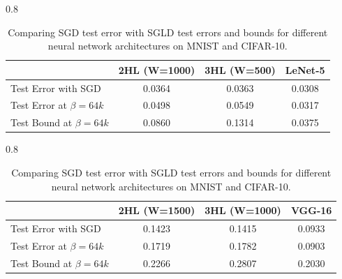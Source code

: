 \documentclass{article} %
\begin{document}
\begin{table}[htbp]
\centering

\begin{subtable}[t]{0.8\textwidth}
\centering
\begin{tabular}{lccc}
\toprule
 & 2HL (W=1000) & 3HL (W=500) & LeNet-5 \\
\midrule
Test Error with SGD & 0.0364 & 0.0363 & 0.0308 \\
Test Error at $\beta = 64k$ & 0.0498 & 0.0549 & 0.0317 \\
Test Bound at $\beta = 64k$ & 0.0860 & 0.1314 & 0.0375 \\
\bottomrule
\end{tabular}
\caption{MNIST, 8k training examples (true labels).}
\label{tab:mnist_results_sgd}
\end{subtable}

\vspace{0.5em}

\begin{subtable}[t]{0.8\textwidth}
\centering
\begin{tabular}{lccc}
\toprule
 & 2HL (W=1500) & 3HL (W=1000) & VGG-16 \\
\midrule
Test Error with SGD & 0.1423 & 0.1415 & 0.0933 \\
Test Error at $\beta = 64k$ & 0.1719 & 0.1782 & 0.0903 \\
Test Bound at $\beta = 64k$ & 0.2266 & 0.2807 & 0.2030 \\
\bottomrule
\end{tabular}
\caption{CIFAR-10, 8k training examples (true labels).}
\label{tab:cifar_results_sgd}
\end{subtable}

\caption{Comparing SGD test error with SGLD test errors and bounds for different neural network architectures on MNIST and CIFAR-10.}
\label{tab:combined_results_sgd}
\end{table}
\FloatBarrier
\end{document}
